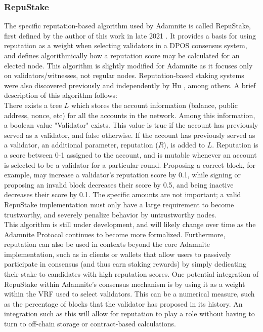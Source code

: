 \documentclass[conference]{IEEEtran}
\begin{document}
\subsubsection{RepuStake}
The specific reputation-based algorithm used by Adamnite is called RepuStake, first defined by the author of this work in late 2021 \cite{Chaudhury2021Reputsake}. It provides a basis for using reputation as a weight when selecting validators in a DPOS consensus system, and defines algorithmically how a reputation score may be calculated for an elected node. This algorithm is slightly modified for Adamnite as it focuses only on validators/witnesses, not regular nodes. Reputation-based staking systems were also discovered previously and independently by Hu \cite{Hu2020ImprovedDPOS}, among others. A brief description of this algorithm follows:\\
There exists a tree $L$ which stores the account information (balance, public address, nonce, etc) for all the accounts in the network. Among this information, a boolean value "Validator" exists. This value is true if the account has previously served as a validator, and false otherwise. If the account has previously served as a validator, an additional parameter, reputation ($R$), is added to $L$. Reputation is a score between 0-1 assigned to the account, and is mutable whenever an account is selected to be a validator for a particular round. Proposing a correct block, for example, may increase a validator's reputation score by 0.1, while signing or proposing an invalid block decreases their score by 0.5, and being inactive decreases their score by 0.1. The specific amounts are not important; a valid RepuStake implementation must only have a large requirement to become trustworthy, and severely penalize behavior by untrustworthy nodes.\\

This algorithm is still under development, and will likely change over time as the Adamnite Protocol continues to become more formalized. Furthermore, reputation can also be used in contexts beyond the core Adamnite implementation, such as in clients or wallets that allow users to passively participate in consensus (and thus earn staking rewards) by simply dedicating their stake to candidates with high reputation scores. One potential integration of RepuStake within Adamnite's consensus mechanism is by using it as a weight within the VRF used to select validators. This can be a numerical measure, such as the percentage of blocks that the validator has proposed in its history. An integration such as this will allow for reputation to play a role without having to turn to off-chain storage or contract-based calculations.
\end{document}
